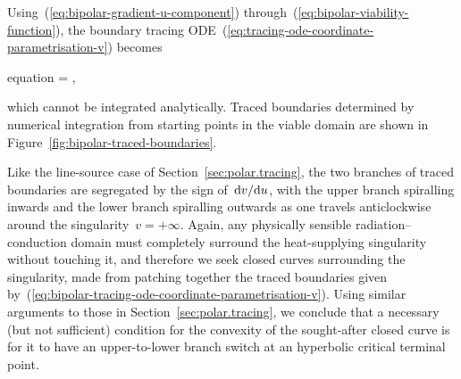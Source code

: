 Using~(\ref{eq:bipolar-gradient-u-component})
through~(\ref{eq:bipolar-viability-function}),
the boundary tracing ODE~(\ref{eq:tracing-ode-coordinate-parametrisation-v})
becomes
\begin{important}{equation}
   =
    \pm
    ,
  \label{eq:bipolar-tracing-ode-coordinate-parametrisation-v}
\end{important}
which cannot be integrated analytically.
Traced boundaries determined by numerical integration
from starting points in the viable domain
are shown in Figure~\ref{fig:bipolar-traced-boundaries}.

Like the line-source case of Section~\ref{sec:polar.tracing},
the two branches of traced boundaries are segregated
by the sign of~$\mathop{}\!\mathrm{d} v / {\mathop{}\!\mathrm{d} u}$,
with the upper branch spiralling inwards
and the lower branch spiralling outwards
as one travels anticlockwise
around the singularity~$v = +\infty$.
Again, any physically sensible radiation--conduction domain
must completely surround the heat-supplying singularity without touching it,
and therefore we seek closed curves surrounding the singularity,
made from patching together the traced boundaries
given by~(\ref{eq:bipolar-tracing-ode-coordinate-parametrisation-v}).
Using similar arguments to those in Section~\ref{sec:polar.tracing},
we conclude that a necessary (but not sufficient) condition
for the convexity of the sought-after closed curve
is for it to have an upper-to-lower branch switch
at an hyperbolic critical terminal point.

